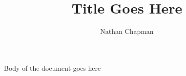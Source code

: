 \documentclass[11pt,letterpaper]{article}
\author{Nathan Chapman}
\title{Title Goes Here}
\begin{document}
	\maketitle %
	
	
	
	Body of the document goes here
	
\end{document}
